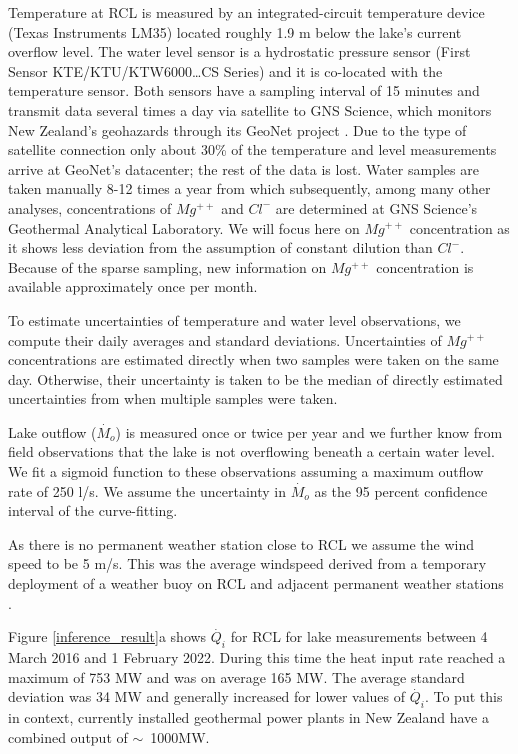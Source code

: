 \documentclass[doublespacing]{bmcart}
\begin{document}
Temperature at RCL is measured by an integrated-circuit temperature device
(Texas Instruments LM35) located roughly 1.9 m below the lake's current overflow
level. The water level sensor is a hydrostatic pressure sensor (First Sensor
KTE/KTU/KTW6000\ldots CS Series) and it is co-located with the temperature
sensor. Both sensors have a sampling interval of 15 minutes and transmit data
several times a day via satellite to GNS Science, which monitors New Zealand's
geohazards through its GeoNet project \cite{GeoNetHome}. Due to the type of
satellite connection only about 30\% of the temperature and level measurements
arrive at GeoNet's datacenter; the rest of the data is lost. Water samples are
taken manually 8-12 times a year from which subsequently, among many other
analyses, concentrations of $Mg^{++}$ and $Cl^-$ are determined at GNS Science's
Geothermal Analytical Laboratory. We will focus here on $Mg^{++}$ concentration
as it shows less deviation from the assumption of constant dilution than $Cl^-$.
Because of the sparse sampling, new information on $Mg^{++}$ concentration is
available approximately once per month.
 
To estimate uncertainties of temperature and water level observations, we 
compute their daily averages and standard deviations. Uncertainties of $Mg^{++}$
concentrations are estimated directly when two samples were taken on the same day.
Otherwise, their uncertainty is taken to be the median of directly estimated
uncertainties from when multiple samples were taken. 

Lake outflow ($\dot{M_o}$) is measured once or twice per year and we further
know from field observations that the lake is not overflowing beneath a certain
water level. We fit a sigmoid function to these observations assuming a maximum
outflow rate of 250 l/s. We assume the uncertainty in $\dot{M_o}$ as the 95
percent confidence interval of the curve-fitting.

As there is no permanent weather station close to RCL we assume the wind speed
to be 5 m/s. This was the average windspeed derived from a temporary deployment
of a weather buoy on RCL and adjacent permanent weather stations
\cite{hurstUseWeatherBuoy2012}.

Figure \ref{inference_result}a shows $\dot{Q_i}$ for RCL for lake measurements
between 4 March 2016 and 1 February 2022. During this time the heat input rate
reached a maximum of 753 MW and was on average 165 MW. The average standard
deviation was 34 MW and generally increased for lower values of $\dot{Q_i}$. To
put this in context, currently installed geothermal power plants in New Zealand
have a combined output of $\sim$~1000MW.
\end{document}
